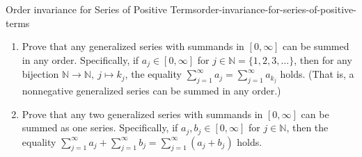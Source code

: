 \begin{mystexercise}{Order invariance for Series of Positive Terms}{order-invariance-for-series-of-positive-terms}\label{Order invariance for Series of Positive Terms }\label{order invariance for series of positive terms}\begin{enumerate}
\item Prove that any generalized series with summands in $[0, \infty]$ can be summed in any order. Specifically, if $a_j \in [0, \infty]$ for $j \in \mathbb{N} = \{1, 2, 3, \dots\}$, then for any bijection $\mathbb{N} \to \mathbb{N},\ j \mapsto k_j$, the equality $\sum_{j=1}^\infty a_j = \sum_{j=1}^\infty a_{k_j}$ holds. (That is, a nonnegative generalized series can be summed in any order.)
\item Prove that any two generalized series with summands in $[0, \infty]$ can be summed as one series. Specifically, if $a_j, b_j \in [0, \infty]$ for $j \in \mathbb{N}$, then the equality $\sum_{j=1}^\infty a_j + \sum_{j=1}^\infty b_j = \sum_{j=1}^\infty (a_j + b_j)$ holds.
\end{enumerate}

\end{mystexercise}
